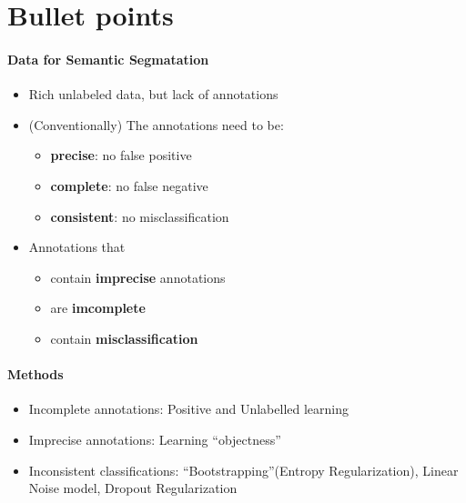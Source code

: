 \section{Bullet points}


\paragraph{Data for Semantic Segmatation}
\begin{itemize}
  \item Rich unlabeled data, but lack of annotations
  \item (Conventionally) The annotations need to be:
  \begin{itemize}
    \item \textbf{precise}: no false positive
    \item \textbf{complete}: no false negative
    \item \textbf{consistent}: no misclassification
  \end{itemize}


  \item Annotations that
  \begin{itemize}
      \item contain \textbf{imprecise} annotations
      \item are \textbf{imcomplete}
      \item contain \textbf{misclassification}
  \end{itemize}

\end{itemize}


\paragraph{Methods}
\begin{itemize}
  \item Incomplete annotations: Positive and Unlabelled learning
  \item Imprecise annotations: Learning ``objectness''
  \item Inconsistent classifications: ``Bootstrapping''(Entropy Regularization), Linear Noise model, Dropout Regularization
\end{itemize}

